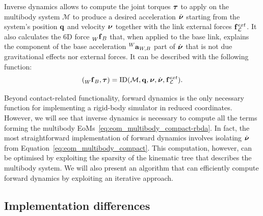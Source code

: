 \begin{definition*}
\label{def:id}
%
Inverse dynamics allows to compute the joint torques $\Torques$ to apply on the multibody system $\mathcal{M}$ to produce a desired acceleration $\Nud$ starting from the system's position $\Qu$ and velocity $\Nu$ together with the link external forces $\forcesix^{ext}_\mathcal{L}$.
It also calculates the 6D force $\forcesix[W]_{B}$ that, when applied to the base link, explains the component of the base acceleration $\accsix[W]_{W,B}$ part of $\Nud$ that is not due gravitational effects nor external forces.
It can be described with the following function:
%
\begin{equation*}
    (\forcesix[W]_{B}, \Torques) = \operatorname{ID}(\mathcal{M}, \Qu, \Nu, \Nud, \forcesix^{ext}_\mathcal{L})
    .
\end{equation*}
%
\end{definition*}

Beyond contact-related functionality, forward dynamics is the only necessary function for implementing a rigid-body simulator in reduced coordinates.
However, we will see that inverse dynamics is necessary to compute all the terms forming the multibody \acp{EoM}~\eqref{eq:eom_multibody_compact-rbda}.
In fact, the most straightforward implementation of forward dynamics involves isolating $\Nud$ from Equation~\eqref{eq:eom_multibody_compact}.
This computation, however, can be optimised by exploiting the sparsity of the kinematic tree that describes the multibody system.
We will also present an algorithm that can efficiently compute forward dynamics by exploiting an iterative approach.

\subsection{Implementation differences}

